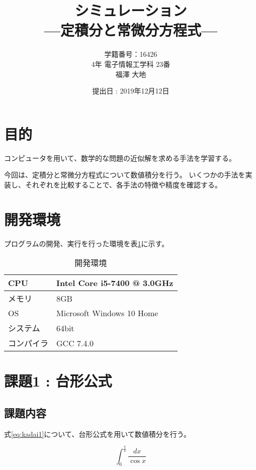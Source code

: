 \documentclass[a4j,titlepage]{jsarticle}
\begin{document}
\begin{titlepage}
  \title{\huge{シミュレーション} \\ \LARGE{---定積分と常微分方程式---}}
	\author{学籍番号：16426 \\ 4年 電子情報工学科 23番 \\ 福澤 大地}
	\date{提出日 : 2019年12月12日}
  \maketitle
\end{titlepage}


\section{目的}
コンピュータを用いて、数学的な問題の近似解を求める手法を学習する。

今回は、定積分と常微分方程式について数値積分を行う。
いくつかの手法を実装し、それぞれを比較することで、各手法の特徴や精度を確認する。


\section{開発環境}
プログラムの開発、実行を行った環境を表\ref{tb:kan}に示す。

\begin{table}[H]
  \centering
  \caption{開発環境}
  \label{tb:kan}

  \begin{tabular}{|l|l|}
    \hline
    CPU & Intel Core i5-7400 @ 3.0GHz \\ \hline
    メモリ & 8GB \\ \hline
    OS & Microsoft Windows 10 Home \\ \hline
    システム & 64bit \\ \hline
    コンパイラ & GCC 7.4.0 \\ \hline
  \end{tabular}
\end{table}


\section{課題1 : 台形公式}
\subsection{課題内容}
式\ref{eq:kadai1}について、台形公式を用いて数値積分を行う。

\begin{equation}
  \int_0^\frac{\pi}{6} \frac{dx}{\cos x}
  \label{eq:kadai1}
\end{equation}
\end{document}
